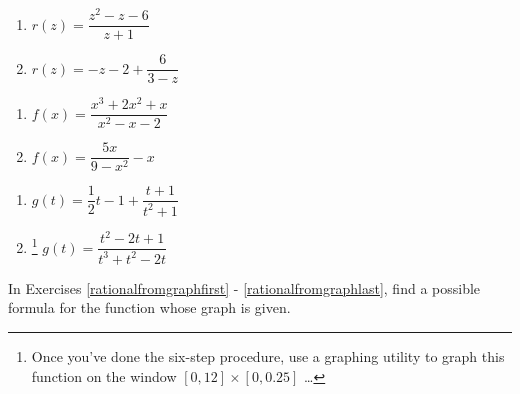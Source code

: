 \begin{multicols}{2}
\begin{enumerate}
\setcounter{enumi}{\value{HW}}

\item $r(z) = \dfrac{z^2-z-6}{z+1}$

\item $r(z) =-z-2+\dfrac{6}{3-z}$

\setcounter{HW}{\value{enumi}}
\end{enumerate}
\end{multicols}

\begin{multicols}{2}
\begin{enumerate}
\setcounter{enumi}{\value{HW}}

\item $f(x) = \dfrac{x^3+2x^2+x}{x^2-x-2}$

\item $f(x) = \dfrac{5x}{9-x^2} - x$

\setcounter{HW}{\value{enumi}}
\end{enumerate}
\end{multicols}

\begin{multicols}{2}
\begin{enumerate}
\setcounter{enumi}{\value{HW}}

\item  $g(t) =\dfrac{1}{2}t-1 + \dfrac{t+1}{t^2+1}$

\item \hspace{-0.1in}\footnote{Once you've done the six-step procedure, use a graphing utility to graph this function on the window $[0, 12] \times [0, 0.25]$ \ldots} $g(t) = \dfrac{t^{2} - 2t + 1}{t^{3} + t^{2} - 2t}$ \label{sixsteplast}

\setcounter{HW}{\value{enumi}}
\end{enumerate}
\end{multicols}

In Exercises \ref{rationalfromgraphfirst} - \ref{rationalfromgraphlast}, find a possible formula for the function whose graph is given.

